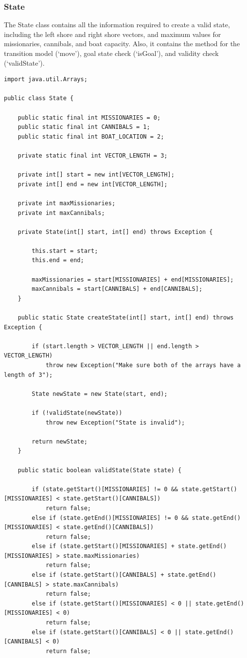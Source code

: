 \documentclass[11pt]{article}
\begin{document}
\subsubsection{State}
The State class contains all the information required to create a valid state, including the left shore and right shore vectors, and maximum values for missionaries, cannibals, and boat capacity. Also, it contains the method for the transition model (`move'), goal state check (`isGoal'), and validity check (`validState').
\begin{lstlisting}
import java.util.Arrays;

public class State {
	
	public static final int MISSIONARIES = 0;
	public static final int CANNIBALS = 1;
	public static final int BOAT_LOCATION = 2;
	
	private static final int VECTOR_LENGTH = 3;
	
	private int[] start = new int[VECTOR_LENGTH];
	private int[] end = new int[VECTOR_LENGTH];
	
	private int maxMissionaries;
	private int maxCannibals;
	
	private State(int[] start, int[] end) throws Exception {
		
		this.start = start;
		this.end = end;
		
		maxMissionaries = start[MISSIONARIES] + end[MISSIONARIES];
		maxCannibals = start[CANNIBALS] + end[CANNIBALS];
	}
	
	public static State createState(int[] start, int[] end) throws Exception {
		
		if (start.length > VECTOR_LENGTH || end.length > VECTOR_LENGTH)
			throw new Exception("Make sure both of the arrays have a length of 3");
		
		State newState = new State(start, end);
		
		if (!validState(newState))
			throw new Exception("State is invalid");
		
		return newState;
	}
	
	public static boolean validState(State state) {
		
		if (state.getStart()[MISSIONARIES] != 0 && state.getStart()[MISSIONARIES] < state.getStart()[CANNIBALS])
			return false;
		else if (state.getEnd()[MISSIONARIES] != 0 && state.getEnd()[MISSIONARIES] < state.getEnd()[CANNIBALS])
			return false;
		else if (state.getStart()[MISSIONARIES] + state.getEnd()[MISSIONARIES] > state.maxMissionaries)
			return false;
		else if (state.getStart()[CANNIBALS] + state.getEnd()[CANNIBALS] > state.maxCannibals)
			return false;
		else if (state.getStart()[MISSIONARIES] < 0 || state.getEnd()[MISSIONARIES] < 0)
			return false;
		else if (state.getStart()[CANNIBALS] < 0 || state.getEnd()[CANNIBALS] < 0)
			return false;
		

\end{lstlisting}
\end{document}

